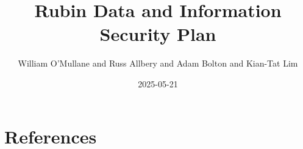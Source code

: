 \documentclass[OPS,obsolete,authoryear,toc]{lsstdoc}
\title{Rubin Data and Information Security Plan}
\author{%
William O'Mullane and Russ Allbery and Adam Bolton and Kian-Tat Lim
}
\date{2025-05-21}
\begin{document}
\maketitle


\appendix
\section{References} \label{sec:bib}
\renewcommand{\refname}{} %


%
\printglossaries
\end{document}
